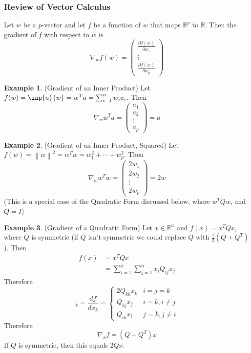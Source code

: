 \documentclass[12pt]{article}
\theoremstyle{definition}
\newtheorem{example}{Example}
\newcommand{\R}{\mathbb{R}}
\newcommand{\norm}[1]{\left\lVert#1\right\rVert}
\begin{document}
\subsubsection{Review of Vector Calculus}
Let $w$ be a $p$-vector and let $f$ be a function of $w$ that maps $\R^p$ to $\R$. Then the gradient of $f$ with respect to $w$ is
\begin{equation}
	\nabla_w f(w) = \begin{pmatrix} \frac{\partial f(w)}{\partial w_1} \\ \vdots \\ \frac{\partial f(w)}{\partial w_p} \end{pmatrix}
\end{equation}

\begin{example}(Gradient of an Inner Product)
Let $f(w) = \inp{a}{w} = w^T a = \sum_{i=1}^n w_i a_i$. Then
\begin{equation}
	\nabla_w w^T a = \begin{pmatrix} a_1 \\ a_2 \\ \vdots \\ a_p \end{pmatrix} = a
\end{equation}
\end{example}

\begin{example}(Gradient of an Inner Product, Squared)
Let $f(w) = \norm{w}^2 = w^T w = w_1^2 + \cdots + w_p^2$. Then 
\begin{equation}
	\nabla_w w^T w = \begin{pmatrix} 2w_1 \\ 2w_2 \\ \vdots \\ 2w_p \end{pmatrix} = 2w
\end{equation}
(This is a special case of the Quadratic Form discussed below, where $w^TQw$, and $Q=I$)
\end{example}

\begin{example}(Gradient of a Quadratic Form)
Let $x \in \R^n$ and $f(x) = x^T Q x$, where $Q$ is symmetric (if $Q$ isn't symmetric we could replace $Q$ with $\frac{1}{2}(Q + Q^T)$).
Then
\begin{align*}
	f(x) &= x^T Q x \\
	&= \sum_{i=1}^n \sum_{j=1}^n x_i Q_{ij}x_j
\end{align*}
Therefore
\begin{equation}
	[\nabla_x f]_k = \frac{d f}{d x_k} = \begin{cases}
	2 Q_{kk} x_k & i=j=k \\
	Q_{kj} x_j & i =k, i \neq j \\
	Q_{ik} x_i & j = k, j \neq i
	\end{cases}
\end{equation}
Therefore
\begin{equation}
	\nabla_x f = (Q + Q^T) x 
\end{equation}
If $Q$ is symmetric, then this equals $2Qx$.
\end{example}
\end{document}
